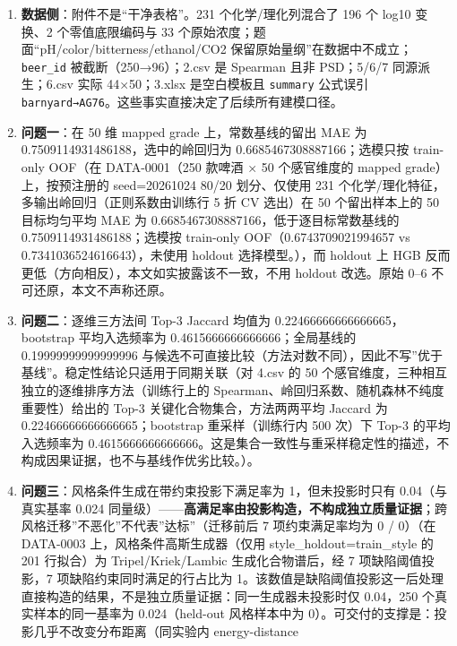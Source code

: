 \documentclass[
  11pt,
]{ctexart}
\providecommand{\tightlist}{%
  \setlength{\itemsep}{0pt}\setlength{\parskip}{0pt}}
\begin{document}
\begin{enumerate}
\def\labelenumi{\arabic{enumi}.}
\tightlist
\item
  \textbf{数据侧}：附件不是``干净表格''。231 个化学/理化列混合了 196 个
  log10 变换、2 个零值底限编码与 33
  个原始浓度；题面``pH/color/bitterness/ethanol/CO2
  保留原始量纲''在数据中不成立；\texttt{beer\_id}
  被截断（250→96）；2.csv 是 Spearman 且非 PSD；5/6/7 同源派生；6.csv
  实际 44×50；3.xlsx 是空白模板且 \texttt{summary} 公式误引
  \texttt{barnyard→AG76}。这些事实直接决定了后续所有建模口径。
\item
  \textbf{问题一}：在 50 维 mapped grade 上，常数基线的留出 MAE 为
  0.7509114931486188，选中的岭回归为 0.6685467308887166；选模只按
  train-only OOF（在 DATA-0001（250 款啤酒 × 50 个感官维度的 mapped
  grade）上，按预注册的 seed=20261024 80/20 划分、仅使用 231
  个化学/理化特征，多输出岭回归（正则系数由训练行 5 折 CV 选出）在 50
  个留出样本上的 50 目标均匀平均 MAE 为
  0.6685467308887166，低于逐目标常数基线的 0.7509114931486188；选模按
  train-only OOF（0.6743709021994657 vs 0.7341036524616643），未使用
  holdout 选择模型。），而 holdout 上 HGB
  反而更低（方向相反），本文如实披露该不一致，不用 holdout 改选。原始
  0--6 不可还原，本文不声称还原。
\item
  \textbf{问题二}：逐维三方法间 Top-3 Jaccard 均值为
  0.22466666666666665，bootstrap 平均入选频率为
  0.4615666666666666；全局基线的 0.19999999999999996
  与候选不可直接比较（方法对数不同），因此不写''优于基线''。稳定性结论只适用于同期关联（对
  4.csv 的 50 个感官维度，三种相互独立的逐维排序方法（训练行上的
  \textbar Spearman\textbar、岭回归系数、随机森林不纯度重要性）给出的
  Top-3 关键化合物集合，方法两两平均 Jaccard 为
  0.22466666666666665；bootstrap 重采样（训练行内 500 次）下 Top-3
  的平均入选频率为
  0.4615666666666666。这是集合一致性与重采样稳定性的描述，不构成因果证据，也不与基线作优劣比较。）。
\item
  \textbf{问题三}：风格条件生成在带约束投影下满足率为 1，但未投影时只有
  0.04（与真实基率 0.024
  同量级）------\textbf{高满足率由投影构造，不构成独立质量证据}；跨风格迁移''不恶化''不代表''达标''（迁移前后
  7 项约束满足率均为 0 / 0）（在 DATA-0003 上，风格条件高斯生成器（仅用
  style\_holdout=train\_style 的 201 行拟合）为 Tripel/Kriek/Lambic
  生成化合物谱后，经 7 项缺陷阈值投影，7 项缺陷约束同时满足的行占比为
  1。该数值是缺陷阈值投影这一后处理直接构造的结果，不是独立质量证据：同一生成器未投影时仅
  0.04，250 个真实样本的同一基率为 0.024（held-out 风格样本中为
  0）。可交付的支撑是：投影几乎不改变分布距离（同实验内 energy-distance

\end{enumerate}
\end{document}
